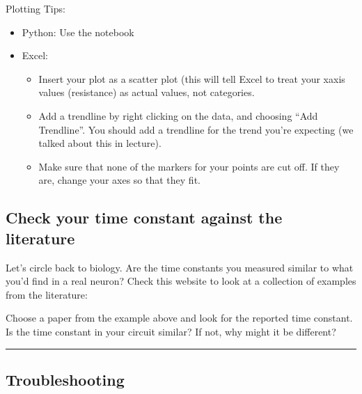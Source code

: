 \documentclass[letterpaper,10pt,english]{jupyterBook}
\begin{document}
\sphinxAtStartPar
Plotting Tips:
\begin{itemize}
\item {} 
\sphinxAtStartPar
Python: Use the  notebook

\item {} 
\sphinxAtStartPar
Excel:
\begin{itemize}
\item {} 
\sphinxAtStartPar
Insert your plot as a scatter plot (this will tell Excel to treat your x\sphinxhyphen{}axis values (resistance) as actual values, not categories.

\item {} 
\sphinxAtStartPar
Add a trendline by right clicking on the data, and choosing “Add Trendline”. You should add a trendline for the trend you’re expecting (we talked about this in lecture).

\item {} 
\sphinxAtStartPar
Make sure that none of the markers for your points are cut off. If they are, change your axes so that they fit.

\end{itemize}

\end{itemize}


\subsection{Check your time constant against the literature}
\label{\detokenize{ModelingNeuralMembranes:check-your-time-constant-against-the-literature}}
\sphinxAtStartPar
Let’s circle back to biology. Are the time constants you measured similar to what you’d find in a real neuron? Check this website to look at a collection of examples from the literature: 

\sphinxAtStartPar
Choose a paper from the example above and look for the reported time constant. Is the time constant in your circuit similar? If not, why might it be different?


\bigskip\hrule\bigskip



\subsection{Troubleshooting}
\label{\detokenize{ModelingNeuralMembranes:troubleshooting}}
\end{document}
